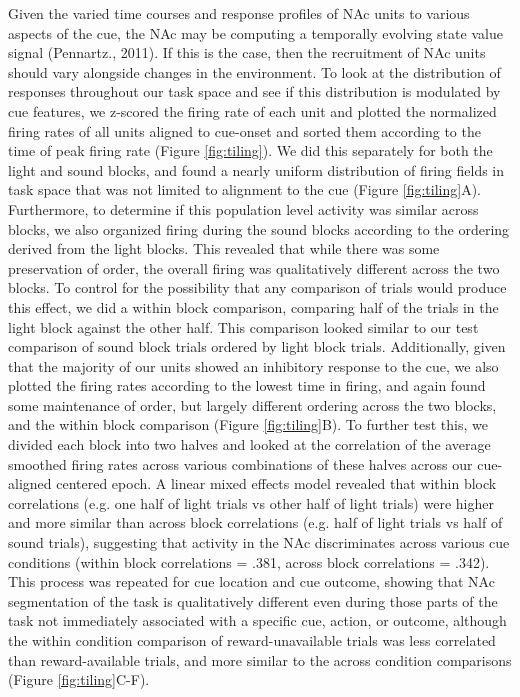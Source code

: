 \documentclass[11pt]{article}
\begin{document}
Given the varied time courses and response profiles of NAc units to various aspects of the cue, the NAc may be computing a temporally evolving state value signal (Pennartz., 2011). If this is the case, then the recruitment of NAc units should vary alongside changes in the environment. To look at the distribution of responses throughout our task space and see if this distribution is modulated by cue features, we z-scored the firing rate of each unit and plotted the normalized firing rates of all units aligned to cue-onset and sorted them according to the time of peak firing rate (Figure \ref{fig:tiling}). We did this separately for both the light and sound blocks, and found a nearly uniform distribution of firing fields in task space that was not limited to alignment to the cue (Figure \ref{fig:tiling}A). Furthermore, to determine if this population level activity was similar across blocks, we also organized firing during the sound blocks according to the ordering derived from the light blocks. This revealed that while there was some preservation of order, the overall firing was qualitatively different across the two blocks. To control for the possibility that any comparison of trials would produce this effect, we did a within block comparison, comparing half of the trials in the light block against the other half. This comparison looked similar to our test comparison of sound block trials ordered by light block trials. Additionally, given that the majority of our units showed an inhibitory response to the cue, we also plotted the firing rates according to the lowest time in firing, and again found some maintenance of order, but largely different ordering across the two blocks, and the within block comparison (Figure \ref{fig:tiling}B). To further test this, we divided each block into two halves and looked at the correlation of the average smoothed firing rates across various combinations of these halves across our cue-aligned centered epoch. A linear mixed effects model revealed that within block correlations (e.g. one half of light trials vs other half of light trials) were higher and more similar than across block correlations (e.g. half of light trials vs half of sound trials), suggesting that activity in the NAc discriminates across various cue conditions (within block correlations = .381, across block correlations = .342). This process was repeated for cue location and cue outcome, showing that NAc segmentation of the task is qualitatively different even during those parts of the task not immediately associated with a specific cue, action, or outcome, although the within condition comparison of reward-unavailable trials was less correlated than reward-available trials, and more similar to the across condition comparisons (Figure \ref{fig:tiling}C-F). 
\end{document}
